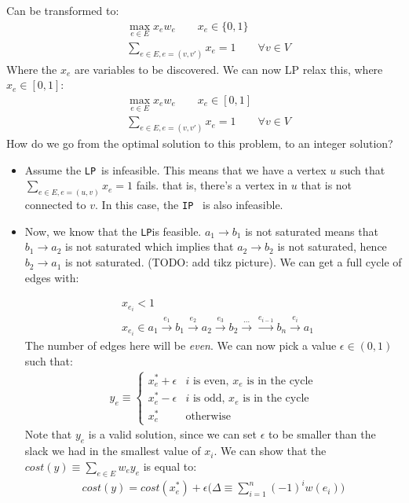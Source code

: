 \documentclass[11pt]{book}
\newcommand{\ip}{\texttt{IP} }
\newcommand{\lp}{\texttt{LP}}
\begin{document}
Can be transformed to:
\begin{align*}
    &\max_{e \in E} x_e w_e \qquad x_e \in \{0, 1\} \\
    &\sum_{e \in E, e = (v, v')} x_e = 1 \qquad \forall v \in V
\end{align*}
Where the $x_e$ are variables to be discovered.  
We can now LP relax this, where $x_e \in [0, 1]$:
\begin{align*}
    &\max_{e \in E} x_e w_e \qquad x_e \in [0, 1] \\
    &\sum_{e \in E, e = (v, v')} x_e = 1 \qquad \forall v \in V
\end{align*}
How do we go from the optimal solution to this problem, to an
integer solution?
\begin{itemize}
    \item Assume the \lp~is infeasible. This means that we have a vertex $u$
        such that $\sum_{e \in E, e = (u, v)} x_e = 1$ fails. that is,
        there's a vertex in $u$ that is not connected to $v$. In this case,
        the \ip~is also infeasible.
    \item Now, we know that the \lp is feasible. $a_1 \rightarrow b_1$ is
        not saturated means that $b_1 \rightarrow a_2$ is not saturated
        which implies that $a_2 \rightarrow b_2$ is not saturated, hence
        $b_2 \rightarrow a_1$ is not saturated. (TODO: add tikz picture).
        We can get a full cycle of edges with:

        \begin{align*}
        &x_{e_i} < 1 \\
        &x_{e_i} \in {a_1 
            \xrightarrow{e_1} b_1 
            \xrightarrow{e_2} a_2 
            \xrightarrow{e_3} b_2
            \xrightarrow \dots 
            \xrightarrow{e_{i-1}} b_n 
        \xrightarrow{e_i} a_1}
    \end{align*}
        The number of
        edges here will be \textit{even}. We can now pick a value $\epsilon \in (0, 1)$
        such that:
        \begin{align*}
        y_e \equiv 
        \begin{cases}
            x_e^* + \epsilon & \text{$i$ is even, $x_e$ is in the cycle} \\
            x_e^* - \epsilon & \text{$i$ is odd, $x_e$ is in the cycle} \\
            x_e^* & \text{otherwise}
        \end{cases}
        \end{align*}
        Note that $y_e$ is a valid solution, since we can set $\epsilon$ to
        be smaller than the slack we had in the smallest value of $x_i$.
        We can show that the $cost(y) \equiv \sum_{e \in E} w_e y_e$ is equal to:
        \begin{align*}
            cost(y) = cost(x_e^*) + \epsilon \bigg(\Delta \equiv \sum_{i=1}^n (-1)^i w(e_i) \bigg)
        \end{align*}


\end{itemize}
\end{document}
